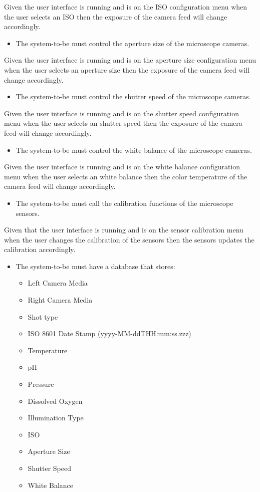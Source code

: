 Given the user interface is running and is on the ISO configuration menu when the user selects an ISO then the exposure of the camera feed will change accordingly.
\begin{itemize}
    \item The system-to-be must control the aperture size of the microscope cameras.
\end{itemize}
Given the user interface is running and is on the aperture size configuration menu when the user selects an aperture size then the exposure of the camera feed will change accordingly.
\begin{itemize}
    \item The system-to-be must control the shutter speed of the microscope cameras.
\end{itemize}
Given the user interface is running and is on the shutter speed configuration menu when the user selects an shutter speed then the exposure of the camera feed will change accordingly.
\begin{itemize}
    \item The system-to-be must control the white balance of the microscope cameras.
\end{itemize}
Given the user interface is running and is on the white balance configuration menu when the user selects an white balance then the color temperature of the camera feed will change accordingly.
\begin{itemize}
    \item The system-to-be must call the calibration functions of the microscope sensors.
\end{itemize}
Given that the user interface is running and is on the sensor calibration menu when the user changes the calibration of the sensors then the sensors updates the calibration accordingly.
\begin{itemize}
    \item The system-to-be must have a database that stores:
    \begin{itemize}
        \item Left Camera Media
        \item Right Camera Media
        \item Shot type
        \item ISO 8601 Date Stamp (yyyy-MM-ddTHH:mm:ss.zzz)
        \item Temperature
        \item pH
        \item Pressure
        \item Dissolved Oxygen
        \item Illumination Type
        \item ISO
        \item Aperture Size
        \item Shutter Speed
        \item White Balance
    \end{itemize}
\end{itemize}
